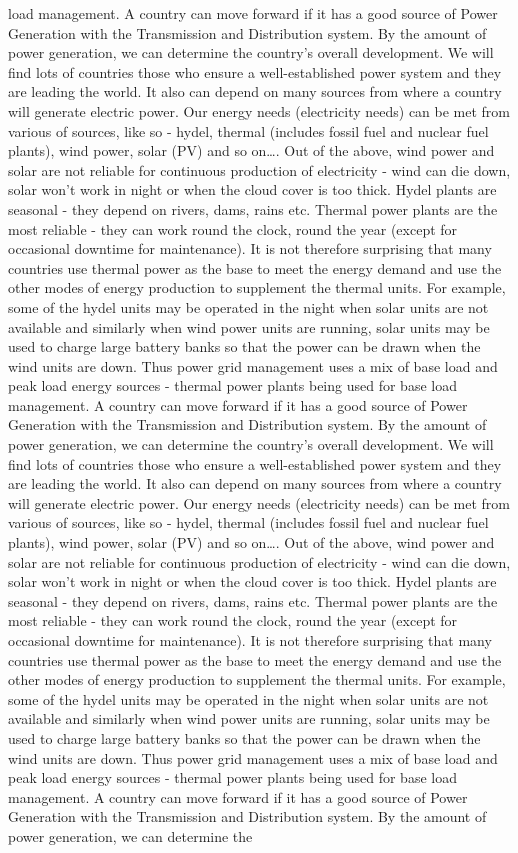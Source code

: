 \documentclass[10pt, a4paper]{article}
\begin{document}
load management. A country can move forward if it has a good source of Power Generation with the Transmission and Distribution system. By the amount of power generation, we can determine the country’s overall development. We will find lots of countries those who ensure a well-established power system and they are leading the world. It also can depend on many sources from where a country will generate electric power. Our energy needs (electricity needs) can be met from various of sources, like so - hydel, thermal (includes fossil fuel and nuclear fuel plants), wind power, solar (PV) and so on\dots. Out of the above, wind power and solar are not reliable for continuous production of electricity - wind can die down, solar won’t work in night or when the cloud cover is too thick. Hydel plants are seasonal - they depend on rivers, dams, rains etc. Thermal power plants are the most reliable - they can work round the clock, round the year (except for occasional downtime for maintenance). It is not therefore surprising that many countries use thermal power as the base to meet the energy demand and use the other modes of energy production to supplement the thermal units. For example, some of the hydel units may be operated in the night when solar units are not available and similarly when wind power units are running, solar units may be used to charge large battery banks so that the power can be drawn when the wind units are down. Thus power grid management uses a mix of base load and peak load energy sources - thermal power plants being used for base load management. A country can move forward if it has a good source of Power Generation with the Transmission and Distribution system. By the amount of power generation, we can determine the country’s overall development. We will find lots of countries those who ensure a well-established power system and they are leading the world. It also can depend on many sources from where a country will generate electric power. Our energy needs (electricity needs) can be met from various of sources, like so - hydel, thermal (includes fossil fuel and nuclear fuel plants), wind power, solar (PV) and so on\dots. Out of the above, wind power and solar are not reliable for continuous production of electricity - wind can die down, solar won’t work in night or when the cloud cover is too thick. Hydel plants are seasonal - they depend on rivers, dams, rains etc. Thermal power plants are the most reliable - they can work round the clock, round the year (except for occasional downtime for maintenance). It is not therefore surprising that many countries use thermal power as the base to meet the energy demand and use the other modes of energy production to supplement the thermal units. For example, some of the hydel units may be operated in the night when solar units are not available and similarly when wind power units are running, solar units may be used to charge large battery banks so that the power can be drawn when the wind units are down. Thus power grid management uses a mix of base load and peak load energy sources - thermal power plants being used for base load management. A country can move forward if it has a good source of Power Generation with the Transmission and Distribution system. By the amount of power generation, we can determine the 
\end{document}
